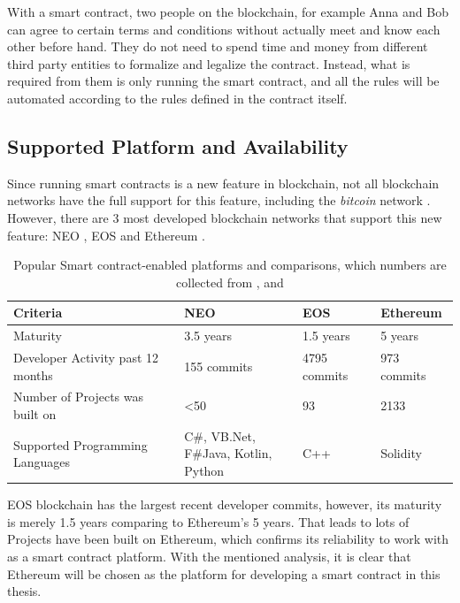 With a smart contract, two people on the blockchain, for example Anna and Bob can agree to certain terms and conditions without actually meet and know each other before hand. They do not need to spend time and money from different third party entities to formalize and legalize the contract. Instead, what is required from them is only running the smart contract, and all the rules will be automated according to the rules defined in the contract itself.

\subsection{Supported Platform and Availability}

Since running smart contracts is a new feature in blockchain, not all blockchain networks have the full support for this feature, including the \textit{bitcoin} network \citep{BitcoinSmartContract}. However, there are 3 most developed blockchain networks that support this new feature: NEO \citep{NEO}, EOS \citep{EOS} and Ethereum \citep{Ethereum}.

\begin{table}[h]
\begin{tabular}{|l|l|l|l|}
\hline
\textbf{Criteria}                 & \textbf{NEO}                         & \textbf{EOS} & \textbf{Ethereum} \\ \hline
Maturity                          & 3.5 years                            & 1.5 years    & 5 years           \\ \hline
Developer Activity past 12 months & 155 commits                          & 4795 commits & 973 commits       \\ \hline
Number of Projects was built on   & \textless{}50                        & 93           & 2133              \\ \hline
Supported Programming Languages   & \makecell{C\#, VB.Net, \\ F\#Java, Kotlin, Python} & C++        & Solidity          \\ \hline
\end{tabular}
\caption{Popular Smart contract-enabled platforms and comparisons, which numbers are collected from \citep{StateOfDapps}, \citep{CrytoProjectsActivity} and \citep{NEODappsNumber} }
\label{table:popularSmartContractPlatform}
\end{table}

EOS blockchain has the largest recent developer commits, however, its maturity is merely 1.5 years comparing to Ethereum's 5 years. That leads to lots of Projects have been built on Ethereum, which confirms its reliability to work with as a smart contract platform. With the mentioned analysis, it is clear that Ethereum will be chosen as the platform for developing a smart contract in this thesis.

